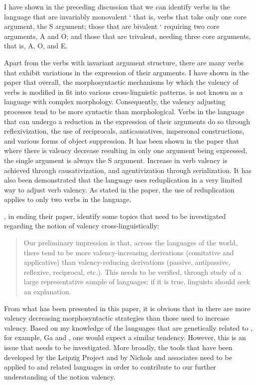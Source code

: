 \documentclass[output=paper]{langsci/langscibook}
\begin{document}
I have shown in the preceding discussion that we can identify verbs in the language that are invariably monovalent ` that is, verbs that take only one core argument, the S argument; those that are bivalent ` requiring two core arguments, A and O; and those that are trivalent, needing three core arguments, that is, A, O, and E.

Apart from the verbs with invariant argument structure, there are many verbs that exhibit variations in the expression of their arguments. I have shown in the paper that overall, the morphosyntactic mechanisms by which the valency of verbs is modified in  fit into various cross-linguistic patterns.  is not known as a language with complex morphology. Consequently, the valency adjusting processes tend to be more syntactic than morphological. Verbs in the language that can undergo a reduction in the expression of their arguments do so through reflexivization, the use of reciprocals, anticausatives, impersonal constructions, and various forms of object suppression. It has been shown in the paper that where there is valency decrease resulting in only one argument being expressed, the single argument is always the S argument.  Increase in verb valency is achieved through causativization, and agentivization through serialization. It has also been demonstrated that the language uses reduplication in a very limited way to adjust verb valency. As stated in the paper, the use of reduplication applies to only two verbs in the language.

\citet[25-27]{dixonaikhenvald2000b}, in ending their paper, identify some topics that need to be investigated regarding the notion of valency cross-linguistically:

\begin{quote}
Our preliminary impression is that, across the languages of the world, there tend to be more valency-increasing derivations (comitative and applicative) than valency-reducing derivations (passive, antipassive, reflexive, reciprocal, etc.). This needs to be verified, through study of a large representative sample of languages; if it is true, linguists should seek an explanation. \citep[26]{dixonaikhenvald2000b}  
\end{quote}

From what has been presented in this paper, it is obvious that in  there are more valency decreasing morphosyntactic strategies than those used to increase valency. Based on my knowledge of the languages that are genetically related to , for example, Ga and , one would expect a similar tendency. However, this is an issue that needs to be investigated. More broadly, the tools that have been developed by the Leipzig Project and by Nichols and associates need to be applied to  and related languages in order to contribute to our further understanding of the notion valency.
\end{document}
